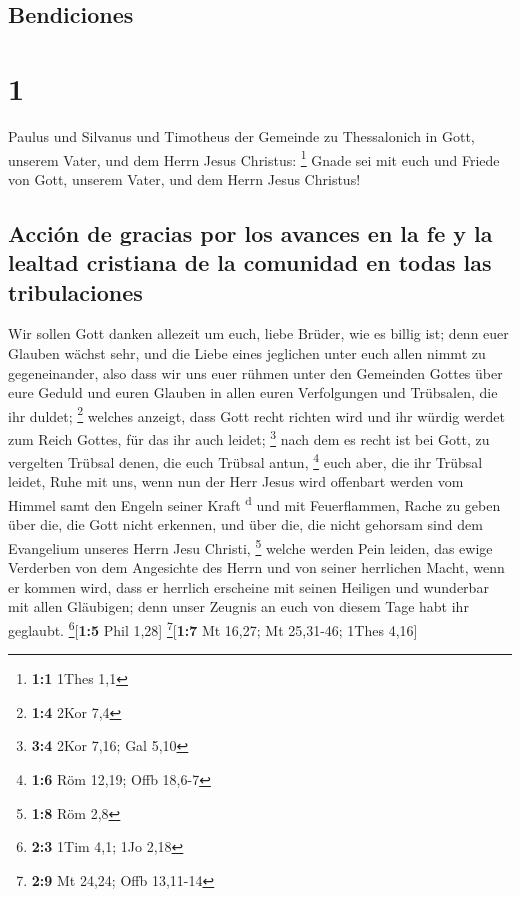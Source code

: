 \hypertarget{bendiciones}{%
\subsection{Bendiciones}\label{bendiciones}}

\hypertarget{section}{%
\section{1}\label{section}}

 Paulus und Silvanus und Timotheus der Gemeinde zu
Thessalonich in Gott, unserem Vater, und dem Herrn Jesus Christus:
\footnote{\textbf{1:1} 1Thes 1,1}  Gnade sei mit euch und
Friede von Gott, unserem Vater, und dem Herrn Jesus Christus!

\hypertarget{acciuxf3n-de-gracias-por-los-avances-en-la-fe-y-la-lealtad-cristiana-de-la-comunidad-en-todas-las-tribulaciones}{%
\subsection{Acción de gracias por los avances en la fe y la lealtad
cristiana de la comunidad en todas las
tribulaciones}\label{acciuxf3n-de-gracias-por-los-avances-en-la-fe-y-la-lealtad-cristiana-de-la-comunidad-en-todas-las-tribulaciones}}

 Wir sollen Gott danken allezeit um euch, liebe Brüder,
wie es billig ist; denn euer Glauben wächst sehr, und die Liebe eines
jeglichen unter euch allen nimmt zu gegeneinander,  also
dass wir uns euer rühmen unter den Gemeinden Gottes über eure Geduld und
euren Glauben in allen euren Verfolgungen und Trübsalen, die ihr duldet;
\footnote{\textbf{1:4} 2Kor 7,4}  welches anzeigt, dass
Gott recht richten wird und ihr würdig werdet zum Reich Gottes, für das
ihr auch leidet; \footnote{\textbf{3:4} 2Kor 7,16; Gal 5,10}
 nach dem es recht ist bei Gott, zu vergelten Trübsal
denen, die euch Trübsal antun, \footnote{\textbf{1:6} Röm 12,19; Offb
  18,6-7}  euch aber, die ihr Trübsal leidet, Ruhe mit
uns, wenn nun der Herr Jesus wird offenbart werden vom Himmel samt den
Engeln seiner Kraft \textsuperscript{d}  und mit
Feuerflammen, Rache zu geben über die, die Gott nicht erkennen, und über
die, die nicht gehorsam sind dem Evangelium unseres Herrn Jesu Christi,
\footnote{\textbf{1:8} Röm 2,8}  welche werden Pein
leiden, das ewige Verderben von dem Angesichte des Herrn und von seiner
herrlichen Macht,  wenn er kommen wird, dass er herrlich
erscheine mit seinen Heiligen und wunderbar mit allen Gläubigen; denn
unser Zeugnis an euch von diesem Tage habt ihr geglaubt.
\footnote{\textbf{2:3} 1Tim 4,1; 1Jo 2,18}{[}\textbf{1:5} Phil 1,28{]}
\footnote{\textbf{2:9} Mt 24,24; Offb 13,11-14}{[}\textbf{1:7} Mt 16,27;
Mt 25,31-46; 1Thes 4,16{]}

